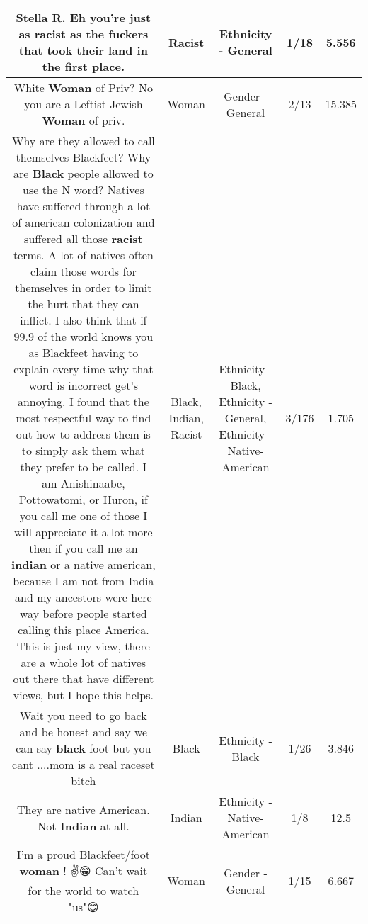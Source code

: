 \documentclass[11pt]{article}
\newlength\mylength
\begin{document}
\begin{center}
\begin{longtable}{|C{.65\mylength}|C{.30\mylength}|C{.12\mylength}|C{.12\mylength}|C{.12\mylength}|}
  \small Stella R. Eh you're just as \textbf{racist} as the fuckers that took their land in the first place.\normalsize   & Racist & Ethnicity - General & 1/18 & 5.556 \\  \hline
  \small White \textbf{Woman} of Priv?  No you are a Leftist Jewish \textbf{Woman} of priv.\normalsize   & Woman & Gender - General & 2/13 & 15.385 \\  \hline
  \small Why are they allowed to call themselves Blackfeet? Why are \textbf{Black} people allowed to use the N word? Natives have suffered through a lot of american colonization and suffered all those \textbf{racist} terms. A lot of natives often claim those words for themselves in order to limit the hurt that they can inflict. I also think that if 99.9 of the world knows you as Blackfeet having to explain every time why that word is incorrect get's annoying. I found that the most respectful way to find out how to address them is to simply ask them what they prefer to be called. I am Anishinaabe, Pottowatomi, or Huron, if you call me one of those I will appreciate it a lot more then if you call me an \textbf{indian} or a native american, because I am not from India and my ancestors were here way before people started calling this place America. This is just my view, there are a whole lot of natives out there that have different views, but I hope this helps.\normalsize   & Black, Indian, Racist & Ethnicity - Black, Ethnicity - General, Ethnicity - Native-American & 3/176 & 1.705 \\  \hline
  \small Wait you need to go back and be honest and say we can say \textbf{black} foot but you cant ....mom is a real raceset bitch\normalsize   & Black & Ethnicity - Black & 1/26 & 3.846 \\  \hline
  \small They are native American. Not \textbf{Indian} at all.\normalsize   & Indian & Ethnicity - Native-American & 1/8 & 12.5 \\  \hline
  \small I'm a proud Blackfeet/foot \textbf{woman} ! ✌😁 Can't wait for the world to watch "us"😊\normalsize   & Woman & Gender - General & 1/15 & 6.667 \\  \hline

\end{longtable}
\end{center}
\end{document}
